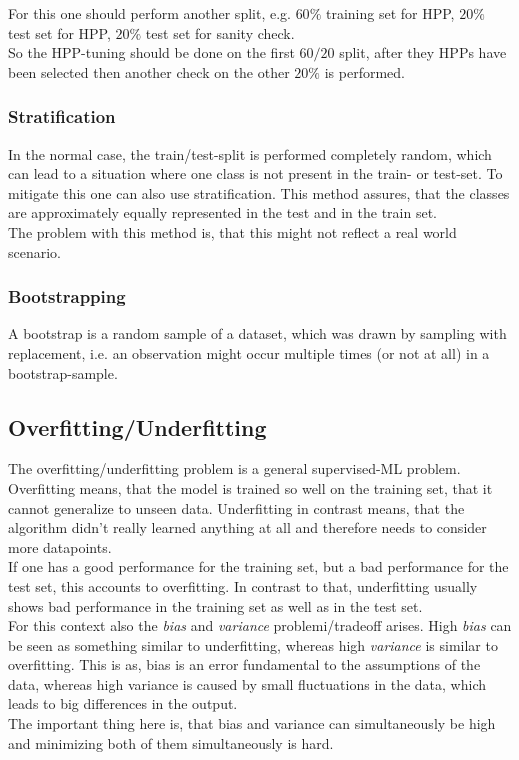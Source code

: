 \documentclass[12pt,a4paper]{article}
\begin{document}
\noindent For this one should perform another split, e.g. \(60\%\) training set for HPP, \(20\%\) test set for HPP, \(20\%\) test set for sanity check.\\
So the HPP-tuning should be done on the first \(60/20\) split, after they HPPs have been selected then another check on the other \(20\%\) is performed.

\subsubsection{Stratification}

\noindent In the normal case, the train/test-split is performed completely random, which can lead to a situation where one class is not present in the train- or test-set. To mitigate this one can also use stratification. This method assures, that the classes are approximately equally represented in the test and in the train set.\\
The problem with this method is, that this might not reflect a real world scenario.

\subsubsection{Bootstrapping}
\label{subsubsec:bootstrapping}

\noindent A bootstrap is a random sample of a dataset, which was drawn by sampling with replacement, i.e. an observation might occur multiple times (or not at all) in a bootstrap-sample.

\subsection{Overfitting/Underfitting}

\noindent The overfitting/underfitting problem is a general supervised-ML problem. Overfitting means, that the model is trained so well on the training set, that it cannot generalize to unseen data. Underfitting in contrast means, that the algorithm didn't really learned anything at all and therefore needs to consider more datapoints.\\
If one has a good performance for the training set, but a bad performance for the test set, this accounts to overfitting. In contrast to that, underfitting usually shows bad performance in the training set as well as in the test set.\\[1em]
For this context also the \textit{bias} and \textit{variance} problemi/tradeoff arises. High \textit{bias} can be seen as something similar to underfitting, whereas high \textit{variance} is similar to overfitting. This is as, bias is an error fundamental to the assumptions of the data, whereas high variance is caused by small fluctuations in the data, which leads to big differences in the output.\\
The important thing here is, that bias and variance can simultaneously be high and minimizing both of them simultaneously is hard.
\end{document}
